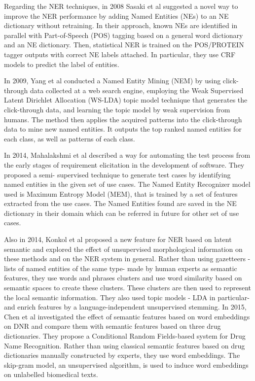 \documentclass[]{book}
\theoremstyle{definition}
\theoremstyle{definition}
\theoremstyle{definition}
\theoremstyle{remark}
\begin{document}
Regarding the NER techniques, in 2008 Sasaki et al
\citep{sasaki2008make} suggested a novel way to improve the NER
performance by adding Named Entities (NEs) to an NE dictionary without
retraining. In their approach, known NEs are identified in parallel with
Part-of-Speech (POS) tagging based on a general word dictionary and an
NE dictionary. Then, statistical NER is trained on the POS/PROTEIN
tagger outputs with correct NE labels attached. In particular, they use
CRF models to predict the label of entities.

In 2009, Yang et al \citep{xu2009named} conducted a Named Entity Mining
(NEM) by using click-through data collected at a web search engine,
employing the Weak Supervised Latent Dirichlet Allocation (WS-LDA) topic
model technique that generates the click-through data, and learning the
topic model by weak supervision from humans. The method then applies the
acquired patterns into the click-through data to mine new named
entities. It outputs the top ranked named entities for each class, as
well as patterns of each class.

In 2014, Mahalakshmi et al \citep{mahalakshmi2018named} described a way
for automating the test process from the early stages of requirement
elicitation in the development of software. They proposed a semi-
supervised technique to generate test cases by identifying named
entities in the given set of use cases. The Named Entity Recognizer
model used is Maximum Entropy Model (MEM), that is trained by a set of
features extracted from the use cases. The Named Entities found are
saved in the NE dictionary in their domain which can be referred in
future for other set of use cases.

Also in 2014, Konkol et al \citep{konkol2015latent} proposed a new
feature for NER based on latent semantic and explored the effect of
unsupervised morphological information on these methods and on the NER
system in general. Rather than using gazetteers -lists of named entities
of the same type- made by human experts as semantic features, they use
words and phrases clusters and use word similarity based on semantic
spaces to create these clusters. These clusters are then used to
represent the local semantic information. They also used topic models -
LDA in particular- and enrich features by a language-independent
unsupervised stemming. In 2015, Chen et al \citep{liu2015effects}
investigated the effect of semantic features based on word embeddings on
DNR and compare them with semantic features based on three drug
dictionaries. They propose a Conditional Random Fields-based system for
Drug Name Recognition. Rather than using classical semantic features
based on drug dictionaries manually constructed by experts, they use
word embeddings. The skip-gram model, an unsupervised algorithm, is used
to induce word embeddings on unlabelled biomedical texts.
\end{document}
